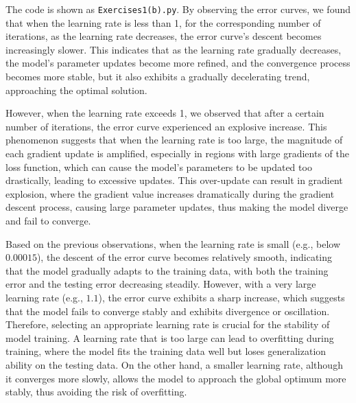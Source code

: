 \documentclass[a4paper, utf8]{ctexart}
\begin{document}
	The code is shown as \verb|Exercises1(b).py|. By observing the error curves, we found that when the learning rate is less than 1, for the corresponding number of iterations, as the learning rate decreases, the error curve's descent becomes increasingly slower. This indicates that as the learning rate gradually decreases, the model's parameter updates become more refined, and the convergence process becomes more stable, but it also exhibits a gradually decelerating trend, approaching the optimal solution.
	
	However, when the learning rate exceeds 1, we observed that after a certain number of iterations, the error curve experienced an explosive increase. This phenomenon suggests that when the learning rate is too large, the magnitude of each gradient update is amplified, especially in regions with large gradients of the loss function, which can cause the model's parameters to be updated too drastically, leading to excessive updates. This over-update can result in gradient explosion, where the gradient value increases dramatically during the gradient descent process, causing large parameter updates, thus making the model diverge and fail to converge.
	
	Based on the previous observations, when the learning rate is small (e.g., below $0.00015$), the descent of the error curve becomes relatively smooth, indicating that the model gradually adapts to the training data, with both the training error and the testing error decreasing steadily. However, with a very large learning rate (e.g., $1.1$), the error curve exhibits a sharp increase, which suggests that the model fails to converge stably and exhibits divergence or oscillation. Therefore, selecting an appropriate learning rate is crucial for the stability of model training. A learning rate that is too large can lead to overfitting during training, where the model fits the training data well but loses generalization ability on the testing data. On the other hand, a smaller learning rate, although it converges more slowly, allows the model to approach the global optimum more stably, thus avoiding the risk of overfitting.
	
\end{document}
